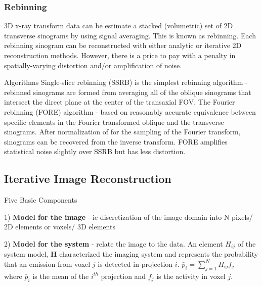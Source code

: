 \documentclass{article}
\begin{document}
\subsubsection{Rebinning}
3D x-ray transform data can be estimate a stacked (volumetric) set of 2D transverse sinograms by using signal averaging. This is known as rebinning. Each rebinning sinogram can be reconstructed with either analytic or iterative 2D reconstruction methods.
However, there is a price to pay with a penalty in spatially-varying distortion and/or amplification of noise.

Algorithms
Single-slice rebinning (SSRB) is the simplest rebinning algorithm - rebinned sinograms are formed from averaging all of the oblique sinograms that intersect the direct plane at the center of the transaxial FOV.
The Fourier rebinning (FORE) algorithm - based on  reasonably accurate equivalence between specific elements in the Fourier transformed oblique and the transverse sinograms. After normalization of for the sampling of the Fourier transform, sinograms can be recovered from the inverse transform. 
FORE amplifies statistical noise slightly over SSRB but has less distortion. 

\subsection{Iterative Image Reconstruction}

Five Basic Components

1) \textbf{Model for the image} - ie discretization of the image domain into N pixels/ 2D elements or voxels/ 3D elements

2) \textbf{Model for the system} - relate the image to the data. An element $H_{ij}$ of the system model, $\textbf{H}$ characterized the imaging system and represents the probability that an emission from voxel $j$ is detected in projection $i$. $\bar{p}_i = \sum_{j=1}^{N} H_{ij}f_j $ - where $\bar{p}_i$ is the mean of the $i^{th}$ projection and $f_j$ is the activity in voxel $j$.
\end{document}
